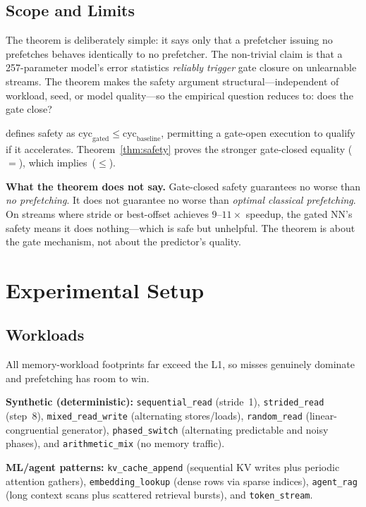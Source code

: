 \documentclass[sigplan,anonymous,review,nonacm]{acmart}
\begin{document}
\subsection{Scope and Limits}
\label{sec:safety_limits}

The theorem is deliberately simple: it says only that a prefetcher issuing no
prefetches behaves identically to no prefetcher. The non-trivial claim is
that a 257-parameter model's error statistics \emph{reliably trigger} gate
closure on unlearnable streams. The theorem makes the safety argument
structural---independent of workload, seed, or model quality---so the
empirical question reduces to: does the gate close?

 defines safety as
$\text{cyc}_\text{gated} \leq \text{cyc}_\text{baseline}$, permitting a
gate-open execution to qualify if it accelerates.
Theorem~\ref{thm:safety} proves the stronger gate-closed equality ($=$),
which implies~($\leq$).

\textbf{What the theorem does not say.} Gate-closed safety guarantees no
worse than \emph{no prefetching}. It does not guarantee no worse than
\emph{optimal classical prefetching}. On streams where stride or best-offset
achieves $9$--$11\times$ speedup, the gated NN's safety means it does
nothing---which is safe but unhelpful. The theorem is about the gate
mechanism, not about the predictor's quality.

\section{Experimental Setup}
\label{sec:setup}

\subsection{Workloads}
\label{sec:workloads}

All memory-workload footprints far exceed the L1, so misses genuinely
dominate and prefetching has room to win.

\textbf{Synthetic (deterministic):}
\texttt{sequential\_read} (stride~1),
\texttt{strided\_read} (step~8),
\texttt{mixed\_read\_write} (alternating stores/loads),
\texttt{random\_read} (linear-congruential generator),
\texttt{phased\_switch} (alternating predictable and noisy phases), and
\texttt{arithmetic\_mix} (no memory traffic).

\textbf{ML/agent patterns:}
\texttt{kv\_cache\_append} (sequential KV writes plus periodic attention
gathers), \texttt{embedding\_lookup} (dense rows via sparse indices),
\texttt{agent\_rag} (long context scans plus scattered retrieval bursts),
and \texttt{token\_stream}.
\end{document}
